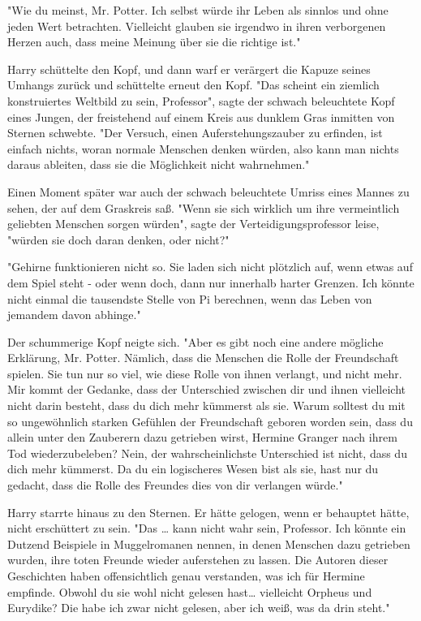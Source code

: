 {"Wie du meinst, Mr. Potter. Ich selbst würde ihr Leben als sinnlos und ohne jeden Wert betrachten. Vielleicht glauben sie irgendwo in ihren verborgenen Herzen auch, dass meine Meinung über sie die richtige ist."

Harry schüttelte den Kopf, und dann warf er verärgert die Kapuze seines Umhangs zurück und schüttelte erneut den Kopf. "Das scheint ein ziemlich konstruiertes Weltbild zu sein, Professor", sagte der schwach beleuchtete Kopf eines Jungen, der freistehend auf einem Kreis aus dunklem Gras inmitten von Sternen schwebte. "Der Versuch, einen Auferstehungszauber zu erfinden, ist einfach nichts, woran normale Menschen denken würden, also kann man nichts daraus ableiten, dass sie die Möglichkeit nicht wahrnehmen."

Einen Moment später war auch der schwach beleuchtete Umriss eines Mannes zu sehen, der auf dem Graskreis saß. "Wenn sie sich wirklich um ihre vermeintlich geliebten Menschen sorgen würden", sagte der Verteidigungsprofessor leise, "würden sie doch daran denken, oder nicht?"

"Gehirne funktionieren nicht so. Sie laden sich nicht plötzlich auf, wenn etwas auf dem Spiel steht - oder wenn doch, dann nur innerhalb harter Grenzen. Ich könnte nicht einmal die tausendste Stelle von Pi berechnen, wenn das Leben von jemandem davon abhinge."

Der schummerige Kopf neigte sich. "Aber es gibt noch eine andere mögliche Erklärung, Mr. Potter. Nämlich, dass die Menschen die Rolle der Freundschaft spielen. Sie tun nur so viel, wie diese Rolle von ihnen verlangt, und nicht mehr. Mir kommt der Gedanke, dass der Unterschied zwischen dir und ihnen vielleicht nicht darin besteht, dass du dich mehr kümmerst als sie. Warum solltest du mit so ungewöhnlich starken Gefühlen der Freundschaft geboren worden sein, dass du allein unter den Zauberern dazu getrieben wirst, Hermine Granger nach ihrem Tod wiederzubeleben? Nein, der wahrscheinlichste Unterschied ist nicht, dass du dich mehr kümmerst. Da du ein logischeres Wesen bist als sie, hast nur du gedacht, dass die Rolle des Freundes dies von dir verlangen würde."

Harry starrte hinaus zu den Sternen. Er hätte gelogen, wenn er behauptet hätte, nicht erschüttert zu sein. "Das … kann nicht wahr sein, Professor. Ich könnte ein Dutzend Beispiele in Muggelromanen nennen, in denen Menschen dazu getrieben wurden, ihre toten Freunde wieder auferstehen zu lassen. Die Autoren dieser Geschichten haben offensichtlich genau verstanden, was ich für Hermine empfinde. Obwohl du sie wohl nicht gelesen hast… vielleicht Orpheus und Eurydike? Die habe ich zwar nicht gelesen, aber ich weiß, was da drin steht."

}
